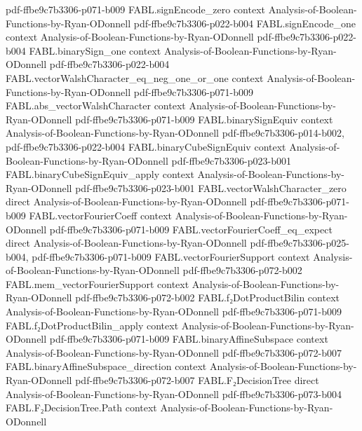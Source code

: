 \begin{theorem}
  {pdf-ffbe9c7b3306-p071-b009}
\proofstep
  {FABL.signEncode_zero}
  {context}
  {Analysis-of-Boolean-Functions-by-Ryan-ODonnell}
  {pdf-ffbe9c7b3306-p022-b004}
\proofstep
  {FABL.signEncode_one}
  {context}
  {Analysis-of-Boolean-Functions-by-Ryan-ODonnell}
  {pdf-ffbe9c7b3306-p022-b004}
\proofstep
  {FABL.binarySign_one}
  {context}
  {Analysis-of-Boolean-Functions-by-Ryan-ODonnell}
  {pdf-ffbe9c7b3306-p022-b004}
\proofstep
  {FABL.vectorWalshCharacter_eq_neg_one_or_one}
  {context}
  {Analysis-of-Boolean-Functions-by-Ryan-ODonnell}
  {pdf-ffbe9c7b3306-p071-b009}
\proofstep
  {FABL.abs_vectorWalshCharacter}
  {context}
  {Analysis-of-Boolean-Functions-by-Ryan-ODonnell}
  {pdf-ffbe9c7b3306-p071-b009}
\proofstep
  {FABL.binarySignEquiv}
  {context}
  {Analysis-of-Boolean-Functions-by-Ryan-ODonnell}
  {pdf-ffbe9c7b3306-p014-b002,
    pdf-ffbe9c7b3306-p022-b004}
\proofstep
  {FABL.binaryCubeSignEquiv}
  {context}
  {Analysis-of-Boolean-Functions-by-Ryan-ODonnell}
  {pdf-ffbe9c7b3306-p023-b001}
\proofstep
  {FABL.binaryCubeSignEquiv_apply}
  {context}
  {Analysis-of-Boolean-Functions-by-Ryan-ODonnell}
  {pdf-ffbe9c7b3306-p023-b001}
\proofstep
  {FABL.vectorWalshCharacter_zero}
  {direct}
  {Analysis-of-Boolean-Functions-by-Ryan-ODonnell}
  {pdf-ffbe9c7b3306-p071-b009}
\proofstep
  {FABL.vectorFourierCoeff}
  {context}
  {Analysis-of-Boolean-Functions-by-Ryan-ODonnell}
  {pdf-ffbe9c7b3306-p071-b009}
\proofstep
  {FABL.vectorFourierCoeff_eq_expect}
  {direct}
  {Analysis-of-Boolean-Functions-by-Ryan-ODonnell}
  {pdf-ffbe9c7b3306-p025-b004,
    pdf-ffbe9c7b3306-p071-b009}
\proofstep
  {FABL.vectorFourierSupport}
  {context}
  {Analysis-of-Boolean-Functions-by-Ryan-ODonnell}
  {pdf-ffbe9c7b3306-p072-b002}
\proofstep
  {FABL.mem_vectorFourierSupport}
  {context}
  {Analysis-of-Boolean-Functions-by-Ryan-ODonnell}
  {pdf-ffbe9c7b3306-p072-b002}
\proofstep
  {FABL.f₂DotProductBilin}
  {context}
  {Analysis-of-Boolean-Functions-by-Ryan-ODonnell}
  {pdf-ffbe9c7b3306-p071-b009}
\proofstep
  {FABL.f₂DotProductBilin_apply}
  {context}
  {Analysis-of-Boolean-Functions-by-Ryan-ODonnell}
  {pdf-ffbe9c7b3306-p071-b009}
\proofstep
  {FABL.binaryAffineSubspace}
  {context}
  {Analysis-of-Boolean-Functions-by-Ryan-ODonnell}
  {pdf-ffbe9c7b3306-p072-b007}
\proofstep
  {FABL.binaryAffineSubspace_direction}
  {context}
  {Analysis-of-Boolean-Functions-by-Ryan-ODonnell}
  {pdf-ffbe9c7b3306-p072-b007}
\proofstep
  {FABL.F₂DecisionTree}
  {direct}
  {Analysis-of-Boolean-Functions-by-Ryan-ODonnell}
  {pdf-ffbe9c7b3306-p073-b004}
\proofstep
  {FABL.F₂DecisionTree.Path}
  {context}
  {Analysis-of-Boolean-Functions-by-Ryan-ODonnell}

\end{theorem}
